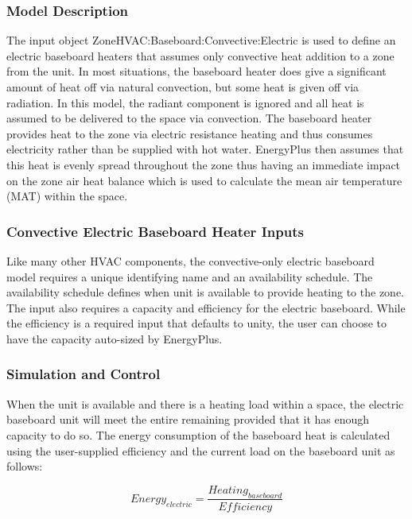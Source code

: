 \subsubsection{Model Description}\label{model-description-1-002}

The input object ZoneHVAC:Baseboard:Convective:Electric is used to define an electric baseboard heaters that assumes only convective heat addition to a zone from the unit. In most situations, the baseboard heater does give a significant amount of heat off via natural convection, but some heat is given off via radiation. In this model, the radiant component is ignored and all heat is assumed to be delivered to the space via convection. The baseboard heater provides heat to the zone via electric resistance heating and thus consumes electricity rather than be supplied with hot water. EnergyPlus then assumes that this heat is evenly spread throughout the zone thus having an immediate impact on the zone air heat balance which is used to calculate the mean air temperature (MAT) within the space.

\subsubsection{Convective Electric Baseboard Heater Inputs}\label{convective-electric-baseboard-heater-inputs}

Like many other HVAC components, the convective-only electric baseboard model requires a unique identifying name and an availability schedule. The availability schedule defines when unit is available to provide heating to the zone. The input also requires a capacity and efficiency for the electric baseboard. While the efficiency is a required input that defaults to unity, the user can choose to have the capacity auto-sized by EnergyPlus.

\subsubsection{Simulation and Control}\label{simulation-and-control-1-000}

When the unit is available and there is a heating load within a space, the electric baseboard unit will meet the entire remaining provided that it has enough capacity to do so. The energy consumption of the baseboard heat is calculated using the user-supplied efficiency and the current load on the baseboard unit as follows:

\begin{equation}
Energ{y_{electric}} = {\frac{{Heatin{g_{baseboard}}}}{Efficiency}}
\end{equation}

